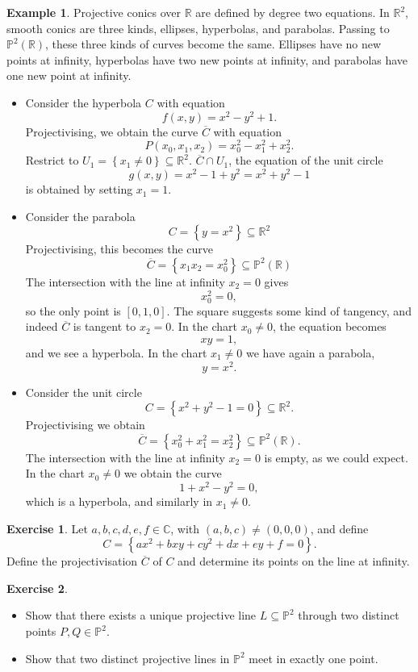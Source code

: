 \documentclass{article}
\newcommand{\R}{\mathbb{R}}
\newcommand{\C}{\mathbb{C}}
\renewcommand{\P}{\mathbb{P}}
\newcommand{\rb}[1]{\left( #1 \right)}
\renewcommand{\sb}[1]{\left[ #1 \right]}
\newcommand{\cb}[1]{\left\{ #1 \right\}}
\theoremstyle{definition}\newtheorem{definition}{Definition}[section]
\theoremstyle{definition}\newtheorem{notation}[definition]{Notation}
\theoremstyle{definition}\newtheorem{remark}[definition]{Remark}
\theoremstyle{definition}\newtheorem{example1}[definition]{Example}
\theoremstyle{definition}\newtheorem{fact}{Fact}
\theoremstyle{definition}\newtheorem{exercise}{Exercise}
\theoremstyle{definition}\newtheorem*{example2}{Example}
\begin{document}
\begin{example1}
Projective conics over $ \R $ are defined by degree two equations. In $ \R^2 $, smooth conics are three kinds, ellipses, hyperbolas, and parabolas. Passing to $ \P^2\rb{\R} $, these three kinds of curves become the same. Ellipses have no new points at infinity, hyperbolas have two new points at infinity, and parabolas have one new point at infinity.
\begin{itemize}
\item Consider the hyperbola $ C $ with equation
$$ f\rb{x, y} = x^2 - y^2 + 1. $$
Projectivising, we obtain the curve $ \overline{C} $ with equation
$$ P\rb{x_0, x_1, x_2} = x_0^2 - x_1^2 + x_2^2. $$
Restrict to $ U_1 = \cb{x_1 \ne 0} \subseteq \R^2 $. $ \overline{C} \cap U_1 $, the equation of the unit circle
$$ g\rb{x, y} = x^2 - 1 + y^2 = x^2 + y^2 - 1 $$
is obtained by setting $ x_1 = 1 $.
\item Consider the parabola
$$ C = \cb{y = x^2} \subseteq \R^2 $$
Projectivising, this becomes the curve
$$ \overline{C} = \cb{x_1x_2 = x_0^2} \subseteq \P^2\rb{\R} $$
The intersection with the line at infinity $ x_2 = 0 $ gives
$$ x_0^2 = 0, $$
so the only point is $ \sb{0, 1, 0} $. The square suggests some kind of tangency, and indeed $ \overline{C} $ is tangent to $ x_2 = 0 $. In the chart $ x_0 \ne 0 $, the equation becomes
$$ xy = 1, $$
and we see a hyperbola. In the chart $ x_1 \ne 0 $ we have again a parabola,
$$ y = x^2. $$
\item Consider the unit circle
$$ C = \cb{x^2 + y^2 - 1 = 0} \subseteq \R^2. $$
Projectivising we obtain
$$ \overline{C} = \cb{x_0^2 + x_1^2 = x_2^2} \subseteq \P^2\rb{\R}. $$
The intersection with the line at infinity $ x_2 = 0 $ is empty, as we could expect. In the chart $ x_0 \ne 0 $ we obtain the curve
$$ 1 + x^2 - y^2 = 0, $$
which is a hyperbola, and similarly in $ x_1 \ne 0 $.
\end{itemize}
\end{example1}

\begin{exercise}
Let $ a, b, c, d, e, f \in \C $, with $ \rb{a, b, c} \ne \rb{0, 0, 0} $, and define
$$ C = \cb{ax^2 + bxy + cy^2 + dx + ey + f = 0}. $$
Define the projectivisation $ \overline{C} $ of $ C $ and determine its points on the line at infinity.
\end{exercise}

\begin{exercise}
\label{ex:18}
\hfill
\begin{itemize}
\item Show that there exists a unique projective line $ L \subseteq \P^2 $ through two distinct points $ P, Q \in \P^2 $.
\item Show that two distinct projective lines in $ \P^2 $ meet in exactly one point.
\end{itemize}
\end{exercise}
\end{document}
